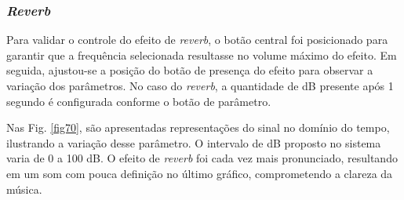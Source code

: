 

\subsubsection*{\textit{Reverb}}

Para validar o controle do efeito de \textit{reverb}, o botão central foi posicionado para garantir que a frequência selecionada resultasse no volume máximo do efeito. Em seguida, ajustou-se a posição do botão de presença do efeito para observar a variação dos parâmetros. No caso do \textit{reverb}, a quantidade de dB presente após 1 segundo é configurada conforme o botão de parâmetro.

Nas Fig. \ref{fig70}, são apresentadas representações do sinal no domínio do tempo, ilustrando a variação desse parâmetro. O intervalo de dB proposto no sistema varia de 0 a 100 dB. O efeito de \textit{reverb} foi cada vez mais pronunciado, resultando em um som com pouca definição no último gráfico, comprometendo a clareza da música.


